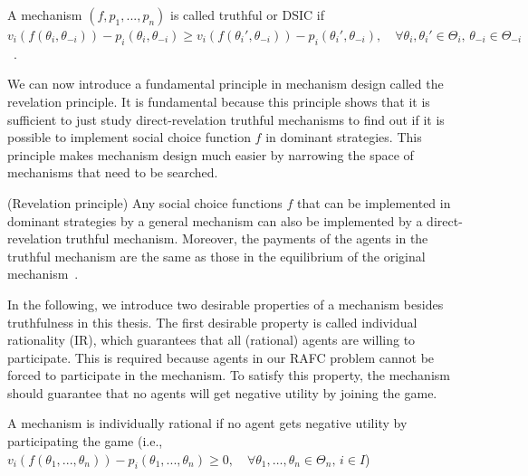 \documentclass[11pt]{phdthesis}
\begin{document}
\begin{definition}[truthfulness]
	A mechanism $(f,p_1,...,p_n)$ is called truthful or DSIC  if $v_i(f(\theta_i, \theta_{-i})) - p_i(\theta_i, \theta_{-i}) \geq v_i(f(\theta_i', \theta_{-i})) - p_i(\theta_i',  \theta_{-i}), \quad \forall \theta_i , \theta_i' \in \Theta_i ,\, \theta_{-i} \in \Theta_{-i} $~\citep[Definition 9.15]{nisan2007algorithmic}.
\end{definition}


%
We can now introduce a fundamental principle in mechanism design called the revelation principle. It is fundamental because this principle shows that it is sufficient to just study direct-revelation truthful mechanisms to find out if it is possible to implement social choice function $f$ in dominant strategies. This principle makes mechanism design much easier by narrowing the space of mechanisms that need to be searched. 

\begin{proposition}(Revelation principle) \label{revelation principle}
	Any social choice functions $f$ that can be implemented in dominant strategies by a general mechanism can also be implemented by a direct-revelation truthful mechanism. Moreover, the payments of the agents in the truthful mechanism are the same as those in the equilibrium of the original mechanism~\citep[Proposition 9.25]{nisan2007algorithmic}.
\end{proposition}



In the following, we introduce two desirable properties of a mechanism besides truthfulness in this thesis. The first desirable property is called individual rationality (IR), which guarantees that all (rational) agents are willing to participate. This is required because agents in our RAFC problem cannot be forced to participate in the mechanism. To satisfy this property, the mechanism should guarantee that no agents will get negative utility by joining the game. 
\begin{definition} [IR]
	A mechanism is individually rational if no agent gets negative utility by participating the game (i.e., $v_i(f(\theta_1,...,\theta_n)) - p_i(\theta_1,...,\theta_n) \geq 0, \quad \forall \theta_1 ,\ldots,\theta_n \in \Theta_n, \, i \in I$)~\citep[Definition 9.18]{nisan2007algorithmic}
\end{definition}
\end{document}
